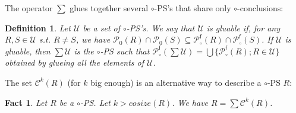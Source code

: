 \documentclass{article}
\theoremstyle{plain}
\newtheorem{definition}{Definition}
\newtheorem{fact}[theorem]{Fact}
\newcommand{\Nat}{\ensuremath{\mathbb{N}}}
\newcommand{\connectedcomponents}[2]{\mathcal{C}^{#2}(#1)}
\newcommand{\cosize}[1]{\textit{cosize}(#1)}
\newcommand{\im}[1]{\textsf{im}(#1)}
\newcommand{\portsatzero}[1]{\mathcal{P}_0(#1)}
\newcommand{\arity}[1]{{\textit{a}}_{#1}}
\newcommand{\Card}[1]{\textsf{Card}\left( #1 \right)}
\newcommand{\conclusionscirc}[1]{\mathcal{P}_\circ^{\textsf{f}}(#1)}
\newcommand{\boxesatzero}[1]{\mathcal{B}_{0}(#1)}
\begin{document}
\begin{comment}
\begin{fact}\label{fact: cosize of connected}
Let $k \in \Nat$. Let $S$ be a differential $\circ$-PS. Let $\mathcal{P}, \mathcal{P'} \subseteq \portsatzero{S}$. Let $T \in \connectedsub{S}{(\mathcal{P}, \mathcal{P'})}{k}$. Let $p \in \portsatzero{T} \setminus \mathcal{P}$. Then $\arity{T}(p) = \arity{S}(p)$.
\end{fact}
\end{comment}

The operator $\sum$ glues together several $\circ$-PS's that share only $\circ$-conclusions:

\begin{definition}
Let $\mathcal{U}$ be a set of $\circ$-PS's. We say that $\mathcal{U}$ is \emph{gluable} if, for any 
$R, S \in \mathcal{U}$ s.t. $R \not= S$, we have $\portsatzero{R} \cap \portsatzero{S} \subseteq \conclusionscirc{R} \cap \conclusionscirc{S}$. 
If $\mathcal{U}$ is gluable, then $\sum \mathcal{U}$ is the $\circ$-PS such that $\conclusionscirc{\sum \mathcal{U}} = \bigcup \{ \conclusionscirc{R} ; R \in \mathcal{U} \}$ obtained by glueing all the elements of $\mathcal{U}$.
\end{definition}



The set $\connectedcomponents{R}{k}$ (for $k$ big enough) is an alternative way to describe a $\circ$-PS $R$:

\begin{fact}\label{fact: connected components}
Let $R$ be a $\circ$-PS. Let $k > \cosize{R}$. We have $R = \sum \connectedcomponents{R}{k}$.
\end{fact}

\begin{comment}
\begin{proof}
We prove, by induction on $\Card{\portsatzero{R}}$, that, for any $p \in \portsatzero{R}$, there exists $T \in \connectedcomponents{R}{k}$ such that $p \in \portsatzero{T}$. If $\Card{\portsatzero{R}} = 1$, then we set $T = R$: since $(\forall p \in \conclusionscirc{R}) (\exists o \in \boxesatzero{R}) p \in \im{b(o)}$, we cannot have $\portsatzero{R} = \conclusionscirc{R}$, hence $\portsatzero{T} \setminus \conclusionscirc{R} \not= \emptyset$.
\end{proof}
\end{comment}
\end{document}
